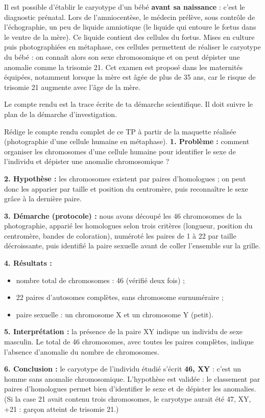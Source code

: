 \documentclass[11pt]{article}
\newcommand{\cle}[1]{{\popxbold\color{popdark}#1}}
\newcounter{popsec}
\newcounter{popsub}
\newcommand{\courssub}[1]{%
  \stepcounter{popsub}%
  \par\vspace{9pt}\noindent{\popxbold\fontsize{11.5}{13}\selectfont\color{popink}{\color{poporange}\thepopsec.\thepopsub}\hspace{6pt}#1}\par\nopagebreak\vspace{4pt}
}
\begin{document}
\begin{savaistu}
Il est possible d'établir le caryotype d'un bébé \textbf{avant sa naissance} : c'est le \cle{diagnostic prénatal}. Lors de l'\cle{amniocentèse}, le médecin prélève, sous contrôle de l'échographie, un peu de liquide amniotique (le liquide qui entoure le fœtus dans le ventre de la mère). Ce liquide contient des cellules du fœtus. Mises en culture puis photographiées en métaphase, ces cellules permettent de réaliser le caryotype du bébé : on connaît alors son sexe chromosomique et on peut dépister une anomalie comme la trisomie 21. Cet examen est proposé dans les maternités équipées, notamment lorsque la mère est âgée de plus de 35 ans, car le risque de trisomie 21 augmente avec l'âge de la mère.
\end{savaistu}

\courssub{Rédaction du compte rendu de TP}

Le compte rendu est la trace écrite de ta démarche scientifique. Il doit suivre le plan de la démarche d'investigation.

\begin{exoresolu}
Rédige le compte rendu complet de ce TP à partir de la maquette réalisée (photographie d'une cellule humaine en métaphase).
\tcblower
\textbf{1. Problème :} comment organiser les chromosomes d'une cellule humaine pour identifier le sexe de l'individu et dépister une anomalie chromosomique ?

\textbf{2. Hypothèse :} les chromosomes existent par paires d'homologues ; on peut donc les apparier par taille et position du centromère, puis reconnaître le sexe grâce à la dernière paire.

\textbf{3. Démarche (protocole) :} nous avons découpé les 46 chromosomes de la photographie, apparié les homologues selon trois critères (longueur, position du centromère, bandes de coloration), numéroté les paires de 1 à 22 par taille décroissante, puis identifié la paire sexuelle avant de coller l'ensemble sur la grille.

\textbf{4. Résultats :}
\begin{itemize}
\item nombre total de chromosomes : 46 (vérifié deux fois) ;
\item 22 paires d'autosomes complètes, sans chromosome surnuméraire ;
\item paire sexuelle : un chromosome X et un chromosome Y (petit).
\end{itemize}

\textbf{5. Interprétation :} la présence de la paire XY indique un individu de sexe masculin. Le total de 46 chromosomes, avec toutes les paires complètes, indique l'absence d'anomalie du nombre de chromosomes.

\textbf{6. Conclusion :} le caryotype de l'individu étudié s'écrit \textbf{46, XY} : c'est un homme sans anomalie chromosomique. L'hypothèse est validée : le classement par paires d'homologues permet bien d'identifier le sexe et de dépister les anomalies. (Si la case 21 avait contenu trois chromosomes, le caryotype aurait été 47, XY, +21 : garçon atteint de trisomie 21.)
\end{exoresolu}
\end{document}
